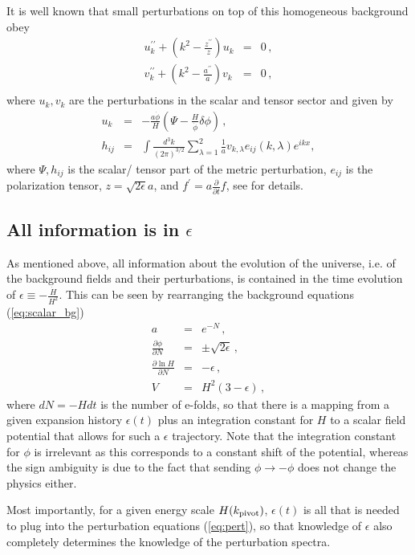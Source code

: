 \documentclass[a4paper,11pt]{article}
\newcommand{\pprime}{{\prime\prime}}
\begin{document}
It is well known that small perturbations on top of this homogeneous
background obey
\begin{eqnarray}\label{eq:pert}
  u_k^\pprime + \left(k^2-\frac{z^\pprime}{z}\right)u_k&=&0\,,\\
  v_k^\pprime + \left(k^2-\frac{a^\pprime}{a}\right)v_k&=&0\,,\\
\end{eqnarray}
where $u_k, v_k$ are the perturbations in the scalar and tensor sector
and given by
\begin{eqnarray}
  u_k&=&-\frac{a\dot\phi}{H}\left(\Psi-\frac{H}{\dot\phi}\delta\phi\right)\,,\\
  h_{ij}&=&\int\frac{d^3k}{(2\pi)^{3/2}}\sum_{\lambda=1}^2\frac{1}{a} v_{k,\lambda} e_{ij}(k,\lambda)e^{ikx},
\end{eqnarray}
where $\Psi, h_{ij}$ is the scalar/ tensor part of the metric
perturbation, $e_{ij}$ is the polarization tensor,
$z=\sqrt{2\epsilon}a$, and $f^\prime=a\frac{\partial}{\partial t}f$,
see \cite{Stewart:1993bc} for details.

\subsection{All information is in $\epsilon$}
As mentioned above, all information about the evolution of the
universe, i.e. of the background fields and their perturbations, is
contained in the time evolution of $\epsilon\equiv-\frac{\dot
  H}{H^2}$. This can be seen by rearranging the background equations
(\ref{eq:scalar_bg})
\begin{eqnarray}\label{eq:all_in_eps}
  a&=&e^{-N}\,,\\
  \frac{\partial\phi}{\partial N}&=&\pm\sqrt{2\epsilon}\,,\\
  \frac{\partial \ln H}{\partial N}&=& - \epsilon\,,\\
  V&=&H^2(3-\epsilon)\,,
\end{eqnarray}
where $dN=-Hdt$ is the number of e-folds, so that there is a mapping
from a given expansion history $\epsilon(t)$ plus an integration
constant for $H$ to a scalar field potential that allows for such a
$\epsilon$ trajectory. Note that the integration constant for $\phi$
is irrelevant as this corresponds to a constant shift of the
potential, whereas the sign ambiguity is due to the fact that sending
$\phi\rightarrow -\phi$ does not change the physics either.

Most importantly, for a given energy scale $H(k_{\rm pivot})$,
$\epsilon(t)$ is all that is needed to plug into the perturbation
equations (\ref{eq:pert}), so that knowledge of $\epsilon$ also
completely determines the knowledge of the perturbation spectra.
\end{document}
